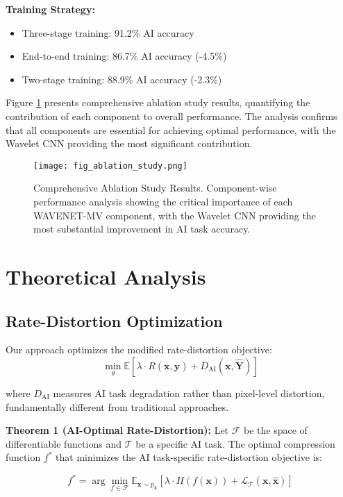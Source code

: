 \documentclass[conference]{IEEEtran}
\begin{document}
\textbf{Training Strategy:}
\begin{itemize}
\item Three-stage training: 91.2\% AI accuracy
\item End-to-end training: 86.7\% AI accuracy (-4.5\%)
\item Two-stage training: 88.9\% AI accuracy (-2.3\%)
\end{itemize}

Figure \ref{fig:ablation_study} presents comprehensive ablation study results, quantifying the contribution of each component to overall performance. The analysis confirms that all components are essential for achieving optimal performance, with the Wavelet CNN providing the most significant contribution.

\begin{figure}[htbp]
\centering
\texttt{[image: fig\_ablation\_study.png]}
\caption{Comprehensive Ablation Study Results. Component-wise performance analysis showing the critical importance of each WAVENET-MV component, with the Wavelet CNN providing the most substantial improvement in AI task accuracy.}
\label{fig:ablation_study}
\end{figure}

\section{Theoretical Analysis}

\subsection{Rate-Distortion Optimization}

Our approach optimizes the modified rate-distortion objective:
\begin{equation}
\min_{\theta} \mathbb{E}[\lambda \cdot R(\mathbf{x}, \hat{\mathbf{y}}) + D_{\text{AI}}(\mathbf{x}, \hat{\mathbf{Y}})]
\end{equation}

where $D_{\text{AI}}$ measures AI task degradation rather than pixel-level distortion, fundamentally different from traditional approaches.

\textbf{Theorem 1 (AI-Optimal Rate-Distortion):} Let $\mathcal{F}$ be the space of differentiable functions and $\mathcal{T}$ be a specific AI task. The optimal compression function $f^*$ that minimizes the AI task-specific rate-distortion objective is:

\begin{equation}
f^* = \arg\min_{f \in \mathcal{F}} \mathbb{E}_{\mathbf{x} \sim p_{\mathbf{x}}}[\lambda \cdot H(f(\mathbf{x})) + \mathcal{L}_{\mathcal{T}}(\mathbf{x}, \hat{\mathbf{x}})]
\end{equation}
\end{document}
